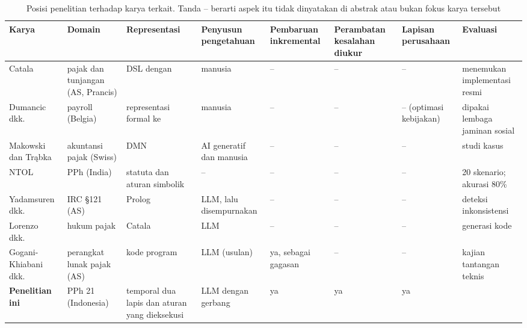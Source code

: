 \begin{table}[t]
\centering
\caption{Posisi penelitian terhadap karya terkait. Tanda -- berarti aspek itu tidak dinyatakan di abstrak atau bukan fokus karya tersebut}
\label{tab:posisi}
\scriptsize
\begin{tabularx}{\textwidth}{@{}P{2.6cm} P{1.9cm} L P{1.9cm} P{1.6cm} P{1.5cm} P{1.4cm} P{2.3cm}@{}}
\toprule
\textbf{Karya} & \textbf{Domain} & \textbf{Representasi} & \textbf{Penyusun pengetahuan} & \textbf{Pembaruan inkremental} & \textbf{Perambatan kesalahan diukur} & \textbf{Lapisan perusahaan} & \textbf{Evaluasi} \\
\midrule
Catala~\cite{merigoux2021catala} & pajak dan tunjangan (AS, Prancis) & DSL dengan  & manusia & -- & -- & -- & menemukan  implementasi resmi \\
Dumancic dkk.~\cite{dumancic2021payroll} & payroll (Belgia) & representasi formal ke  & manusia & -- & -- & -- (optimasi kebijakan) & dipakai lembaga jaminan sosial \\
Makowski dan Tr\k{a}bka~\cite{makowski2025dmn} & akuntansi pajak (Swiss) & DMN & AI generatif dan manusia & -- & -- & -- & studi kasus \\
NTOL~\cite{veeramani2026neurosymbolic} & PPh (India) &  statuta dan aturan simbolik & -- & -- & -- & -- & 20 skenario; akurasi 80\% \\
Yadamsuren dkk.~\cite{yadamsuren2026formalization} & IRC \S121 (AS) & Prolog & LLM, lalu disempurnakan & -- & -- & -- & deteksi inkonsistensi \\
Lorenzo dkk.~\cite{lorenzo2025translating} & hukum pajak & Catala & LLM & -- & -- & -- &  generasi kode \\
Gogani-Khiabani dkk.~\cite{goganikhiabani2025maintaining} & perangkat lunak pajak (AS) & kode program & LLM (usulan) & ya, sebagai gagasan & -- & -- & kajian tantangan teknis \\
\midrule
\textbf{Penelitian ini} & PPh 21 (Indonesia) &  temporal dua lapis dan aturan yang dieksekusi & LLM dengan gerbang & ya & ya & ya &  \\
\bottomrule
\end{tabularx}
\end{table}

